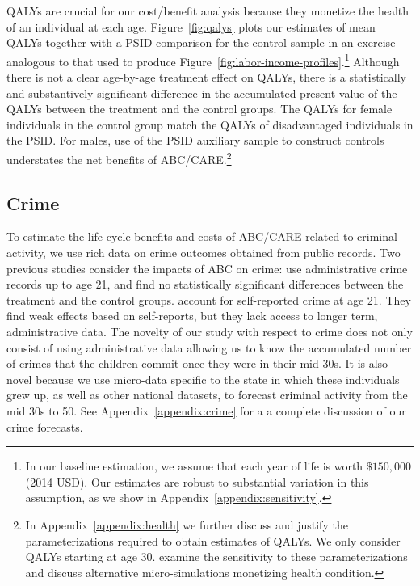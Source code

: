 QALYs are crucial for our cost/benefit analysis because they monetize the health of an individual at each age. Figure~\ref{fig:qalys} plots our estimates of mean QALYs together with a PSID comparison for the control sample in an exercise analogous to that used to produce Figure~\ref{fig:labor-income-profiles}.\footnote{In our baseline estimation, we assume that each year of life is worth  $\$150,000$ (2014 USD). Our estimates are robust to substantial variation in this assumption, as we show in  Appendix~\ref{appendix:sensitivity}.} Although there is not a clear age-by-age treatment effect on QALYs, there is a statistically and substantively significant difference in the accumulated present value of the QALYs between the treatment and the control groups. The QALYs for female individuals in the control group match the QALYs of disadvantaged individuals in the PSID. For males, use of the PSID auxiliary sample to construct controls understates the net benefits of ABC/CARE.\footnote{In  Appendix~\ref{appendix:health} we further discuss and justify the parameterizations required to obtain estimates of QALYs. We only consider QALYs starting at age 30. \citet{Goldman_etal_2015_Future-Adult-Model} examine the sensitivity to these parameterizations and discuss alternative micro-simulations monetizing health condition.}

\subsection{Crime}

To estimate the life-cycle benefits and costs of ABC/CARE related to criminal activity, we use rich data on crime outcomes obtained from public records. Two previous studies consider the impacts of ABC on crime: \citet{Clarke_Campbell_1998_ABC_Comparison_ECRQ} use administrative crime records up to age 21, and find no statistically significant differences between the treatment and the control groups. \cite{Barnett_Masse_2002_benefitcost,Barnett_Masse_2007_EER} account for self-reported crime at age 21. They find weak effects based on self-reports, but they lack access to longer term, administrative data. The novelty of our study with respect to crime does not only consist of using administrative data allowing us to know the accumulated number of crimes that the children commit once they were in their mid 30s. It is also novel because we use micro-data specific to the state in which these individuals grew up, as well as other national datasets, to forecast criminal activity from the mid 30s to 50. See Appendix~\ref{appendix:crime} for a a complete discussion of our crime forecasts.

